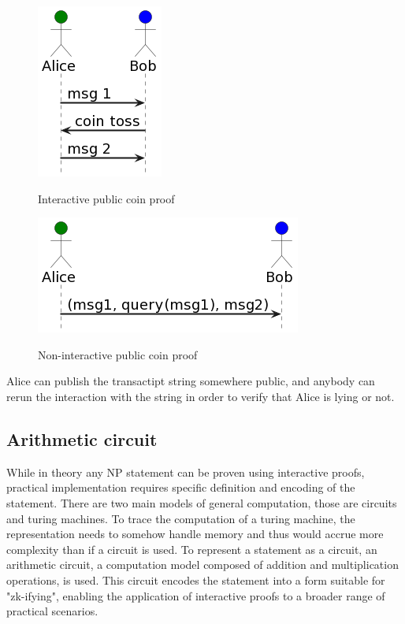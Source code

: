 \documentclass[conference,comsoc,10pt]{IEEEtran}
\begin{document}
        \begin{figure}[h]
            \centering
            \includegraphics[scale=0.7]{../bachelor/assets/images/interactive_coin.png}
            \caption{Interactive public coin proof}
            \label{fig:interactive_coin}
            \cite{Goldwasser1986, youtubeMOOCLecture1}
            \vspace{0.5cm}
        \end{figure}

        \begin{figure}[h]
            \centering
            \includegraphics[scale=0.7]{../bachelor/assets/images/non_interactive_coin.png}
            \caption{Non-interactive public coin proof}
            \label{fig:non_interactive_coin}
            \cite{Fiat, youtubeMOOCLecture1}
            \vspace{0.5cm}
        \end{figure}

        Alice can publish the transactipt string somewhere public, and anybody
        can rerun the interaction with the string in order to verify that Alice
        is lying or not.
        \pagebreak

    \subsection{Arithmetic circuit}

        While in theory any NP statement \cite{goldreich1991proofs} can be proven using
        interactive proofs, practical implementation requires specific definition and
        encoding of the statement. There are two main models of general computation,
        those are circuits and turing machines. To trace the computation of a turing
        machine, the representation needs to somehow handle memory and thus would accrue
        more complexity than if a circuit is used. To represent a statement as a
        circuit, an arithmetic circuit, a computation model composed of addition and
        multiplication operations, is used. This circuit encodes the statement into a
        form suitable for "zk-ifying", enabling the application of interactive proofs
        to a broader range of practical scenarios.
\end{document}
